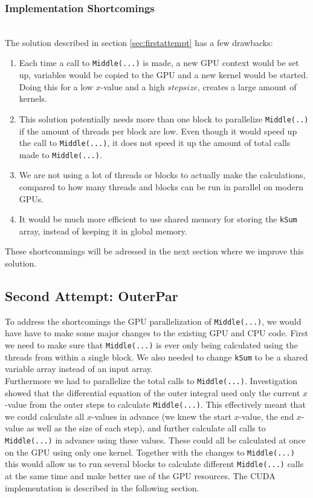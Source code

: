 \subsubsection{Implementation Shortcomings} \hfill \\
\label{label:shortages}
The solution described in section \ref{sec:firstattempt} has a few drawbacks:
\begin{enumerate}
	\item Each time a call to \texttt{Middle(...)} is made, a new GPU context would be set up, variables would be copied to the GPU and a new kernel would be started. Doing this for a low $x$-value and a high $stepsize$, creates a large amount of kernels.
	\item This solution potentially needs more than one block to parallelize \texttt{Middle(..)} if the amount of threads per block are low. Even though it would speed up the call to \texttt{Middle(...)}, it does not speed it up the amount of total calls made to \texttt{Middle(...)}.
	\item We are not using a lot of threads or blocks to actually make the calculations, compared to how many threads and blocks can be run in parallel on modern GPUs.
	\item It would be much more efficient to use shared memory for storing the \texttt{kSum} array, instead of keeping it in global memory.
\end{enumerate}

These shortcommings will be adressed in the next section where we improve this solution.\\

\subsection{Second Attempt: OuterPar}
To address the shortcomings the GPU parallelization of \texttt{Middle(...)}, we would have have to make some major changes to the existing GPU and CPU code. First we need to make sure that \texttt{Middle(...)} is ever only being calculated using the threads from within a single block. We also needed to change \texttt{kSum} to be a shared variable array instead of an input array. \\

Furthermore we had to parallelize the total calls to \texttt{Middle(...)}. Investigation showed that the differential equation of the outer integral used only the current $x$-value from the outer steps to calculate \texttt{Middle(...)}. This effectively meant that we could calculate all $x$-values in advance (we knew the start $x$-value, the end $x$-value as well as the size of each step), and further calculate all calls to \texttt{Middle(...)} in advance using these values. These could all be calculated at once on the GPU using only one kernel. Together with the changes to \texttt{Middle(...)} this would allow us to run several blocks to calculate different \texttt{Middle(...)} calls at the same time and make better use of the GPU resources. The CUDA implementation is described in the following section.

